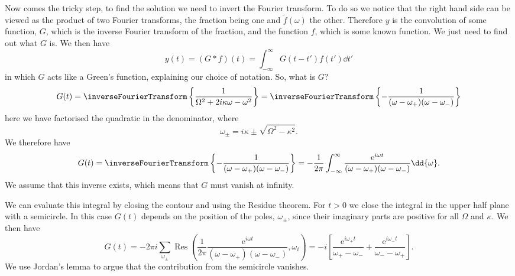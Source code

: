 \documentclass[fleqn]{NotesClass}
\newcommand*{\e}{\mathrm{e}}
\DeclareMathOperator{\Res}{Res}
\begin{document}
    Now comes the tricky step, to find the solution we need to invert the Fourier transform.
    To do so we notice that the right hand side can be viewed as the product of two Fourier transforms, the fraction being one and \(\tilde{f}(\omega)\) the other.
    Therefore \(y\) is the convolution of some function, \(G\), which is the inverse Fourier transform of the fraction, and the function \(f\), which is some known function.
    We just need to find out what \(G\) is.
    We then have
    \begin{equation}
        y(t) = (G \ast f)(t) = \int_{-\infty}^{\infty} G(t - t')f(t') \dd{t'}
    \end{equation}
    in which \(G\) acts like a Green's function, explaining our choice of notation.
    So, what is \(G\)?
    \begin{equation}
        G(t) = \inverseFourierTransform\left\{ \frac{1}{\Omega^2 + 2i\kappa\omega - \omega^2} \right\} = \inverseFourierTransform\left\{ -\frac{1}{(\omega - \omega_{+})(\omega - \omega_{-})} \right\}
    \end{equation}
    here we have factorised the quadratic in the denominator, where
    \begin{equation}
        \omega_{\pm} = i\kappa \pm \sqrt{\Omega^2 - \kappa^2}.
    \end{equation}
    We therefore have
    \begin{equation}
        G(t) = \inverseFourierTransform\left\{ -\frac{1}{(\omega - \omega_{+})(\omega - \omega_{-})} \right\} = -\frac{1}{2\pi} \int_{-\infty}^{\infty} \frac{\e^{i\omega t}}{(\omega - \omega_{+})(\omega - \omega_{-})} \dd{\omega}.
    \end{equation}
    We assume that this inverse exists, which means that \(G\) must vanish at infinity.
    
    We can evaluate this integral by closing the contour and using the Residue theorem.
    For \(t > 0\) we close the integral in the upper half plane with a semicircle.
    In this case \(G(t)\) depends on the position of the poles, \(\omega_{\pm}\), since their imaginary parts are positive for all \(\Omega\) and \(\kappa\).
    We then have
    \begin{equation}
        G(t) = -2\pi i \sum_{\omega_{\pm}} \Res\left( \frac{1}{2\pi} \frac{\e^{i\omega t}}{(\omega - \omega_{+})(\omega - \omega_{-})}, \omega_{i} \right) = -i\left[ \frac{\e^{i\omega_{+}t}}{\omega_{+} - \omega_{-}} + \frac{\e^{i\omega_{-}t}}{\omega_{-} - \omega_{+}} \right].
    \end{equation}
    We use Jordan's lemma to argue that the contribution from the semicircle vanishes.
    
\end{document}
